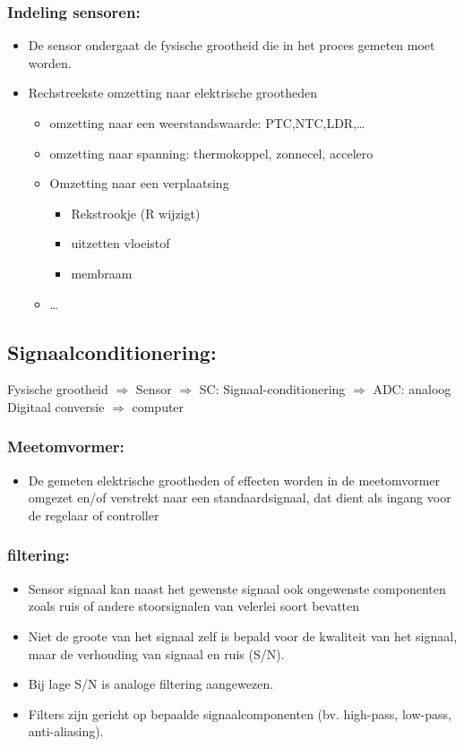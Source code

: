 \documentclass[12pt]{article}
\begin{document}
\subsubsection{Indeling sensoren:}
\begin{itemize}
    \item De sensor ondergaat de fysische grootheid die in het proces gemeten moet worden.
    \item Rechstreekste omzetting naar elektrische grootheden\begin{itemize}
        \item omzetting naar een weerstandswaarde: PTC,NTC,LDR,\dots
        \item omzetting naar spanning: thermokoppel, zonnecel, accelero
        \item Omzetting naar een verplaatsing\begin{itemize}
            \item Rekstrookje (R wijzigt)
            \item uitzetten vloeistof
            \item membraam
        \end{itemize}
        \item \dots
    \end{itemize}
\end{itemize}
\subsection{Signaalconditionering:}
Fysische grootheid $\Rightarrow$ Sensor $\Rightarrow$ SC: Signaal-conditionering $\Rightarrow$ ADC: analoog Digitaal conversie $\Rightarrow$ computer
\subsubsection{Meetomvormer:}
\begin{itemize}
    \item De gemeten elektrische grootheden of effecten worden in de meetomvormer omgezet en/of verstrekt naar een standaardsignaal, dat dient als ingang voor de regelaar of controller
\end{itemize}
\subsubsection{filtering:}
\begin{itemize}
    \item Sensor signaal kan naast het gewenste signaal ook ongewenste componenten zoals ruis of andere stoorsignalen van velerlei soort bevatten
    \item Niet de groote van het signaal zelf is bepald voor de kwaliteit van het signaal, maar de verhouding van signaal en ruis (S/N).
    \item Bij lage S/N is analoge filtering aangewezen.
    \item Filters zijn gericht op bepaalde signaalcomponenten (bv. high-pass, low-pass, anti-aliasing).
\end{itemize}
\end{document}
